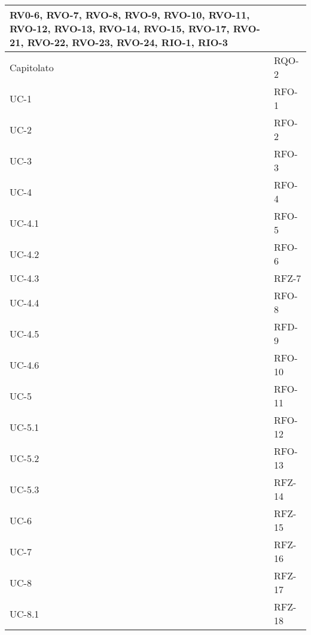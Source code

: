 \begin{xltabular}{\textwidth}{|x| X |}
                RV0-6, \newline
                RVO-7, \newline
                RVO-8, \newline
                RVO-9, \newline
                RVO-10, \newline
                RVO-11, \newline
                RVO-12, \newline
                RVO-13, \newline
                RVO-14, \newline
                RVO-15, \newline
                RVO-17, \newline
                RVO-21, \newline
                RVO-22, \newline
                RVO-23, \newline
                RVO-24, \newline
                RIO-1, \newline
                RIO-3\\
    \hline
    Capitolato & RQO-2\\
    \hline
    UC-1 & RFO-1  \\
    \hline
    UC-2 & RFO-2  \\
    \hline
    UC-3 & RFO-3  \\
    \hline
    UC-4 & RFO-4 \\
    \hline
    UC-4.1 & RFO-5\\
    \hline
    UC-4.2 & RFO-6\\
    \hline
    UC-4.3 & RFZ-7 \\
    \hline
    UC-4.4 & RFO-8\\ 
    \hline
    UC-4.5 & RFD-9\\
    \hline
    UC-4.6 & RFO-10\\
    \hline
    UC-5 & RFO-11\\
    \hline
    UC-5.1 & RFO-12\\
    \hline
    UC-5.2 & RFO-13\\
    \hline
    UC-5.3 & RFZ-14 \\
    \hline
    UC-6 & RFZ-15\\
    \hline
    UC-7 & RFZ-16 \\
    \hline
    UC-8 & RFZ-17\\
    \hline
    UC-8.1 & RFZ-18\\

\end{xltabular}
